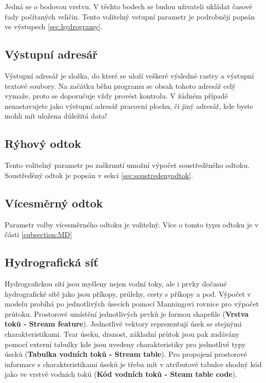 Jedná  se o bodovou vrstvu. V těchto bodech se budou uživateli ukládat časové řady počítaných veličin. Tento volitelný vstupní parametr je podrobněji popsán ve výstupech \ref{sec:hydrogramy}.

\subsection{Výstupní adresář} \label{sec:vstupadresar}
Výstupní adresář je složka, do které se uloží veškeré výsledné rastry a výstupní textové soubory. Na začátku běhu programu se obsah tohoto adresář celý vymaže, proto se doporučuje vždy provést kontrolu. V žádném případě nenastavujete jako výstupní adresář pracovní plochu, či jiný adresář, kde byste mohli mít uložena důležitá data!

\subsection{Rýhový odtok} \label{sec:vstupryhovy}

Tento volitelný parametr po zaškrnutí umožní výpočet soustředěného odtoku. Soustředěný odtok je popsán v sekci \ref{sec:soustredenyodtok}.

\subsection{Vícesměrný odtok} \label{sec:vstupvicesmerny}

Parametr volby vícesměrného odtoku je volitelný. Více o tomto typu odtoku je v části \ref{subsection:MD}


\subsection{Hydrografická síť} \label{sec:vodnitoky}

Hydrografickou sítí jsou myšleny nejen vodní toky, ale i prvky dočasné hydrografické sítě jako jsou příkopy, průlehy, cesty s příkopy a pod. Výpočet v modelu probíhá po jednotlivých úsecích pomocí Manningovi rovnice pro výpočet průtoku. Prostorové umístění jednotlivých prvků je formou shapefile (\textbf{Vrstva toků - Stream feature}). Jednotlivé vektory reprezentují úsek se stejnými charakteristikami. Tvar úseku, drsnost, základní průtok jsou pak zadávány pomocí externí tabulky kde jsou uvedeny charakteristiky pro jednotlivé typy úseků (\textbf{Tabulka vodních toků - Stream table}). Pro propojení prostorové informace s charakteristikami úseků je třeba mít v atributové tabulce shodný kód jako ve vrstvě vodních toků (\textbf{Kód vodních toků - Steam table code}).






